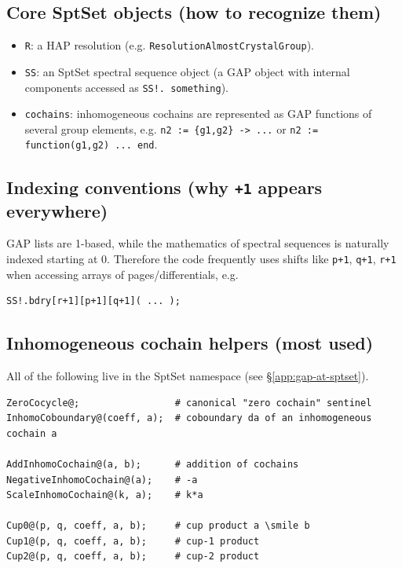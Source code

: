 \documentclass{SciPost}
\begin{document}
\subsection{Core SptSet objects (how to recognize them)}

\begin{itemize}
    \item \texttt{R}: a HAP resolution (e.g. \texttt{ResolutionAlmostCrystalGroup}).
    \item \texttt{SS}: an SptSet spectral sequence object (a GAP object with internal components accessed as \texttt{SS!.\,something}).
    \item \texttt{cochains}: inhomogeneous cochains are represented as GAP functions of several group elements,
    e.g. \texttt{n2 := \{g1,g2\} -> ...} or \texttt{n2 := function(g1,g2) ... end}.
\end{itemize}

\subsection{Indexing conventions (why \texttt{+1} appears everywhere)}

GAP lists are 1-based, while the mathematics of spectral sequences is naturally indexed starting at 0.
Therefore the code frequently uses shifts like \texttt{p+1}, \texttt{q+1}, \texttt{r+1} when accessing arrays of pages/differentials, e.g.
\begin{verbatim}
SS!.bdry[r+1][p+1][q+1]( ... );
\end{verbatim}

\subsection{Inhomogeneous cochain helpers (most used)}

All of the following live in the SptSet namespace (see \S\ref{app:gap-at-sptset}).

\begin{verbatim}
ZeroCocycle@;                 # canonical "zero cochain" sentinel
InhomoCoboundary@(coeff, a);  # coboundary da of an inhomogeneous cochain a

AddInhomoCochain@(a, b);      # addition of cochains
NegativeInhomoCochain@(a);    # -a
ScaleInhomoCochain@(k, a);    # k*a

Cup0@(p, q, coeff, a, b);     # cup product a \smile b
Cup1@(p, q, coeff, a, b);     # cup-1 product
Cup2@(p, q, coeff, a, b);     # cup-2 product
\end{verbatim}
\end{document}
